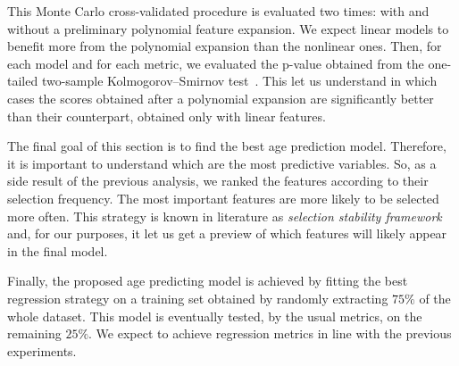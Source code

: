 This Monte Carlo cross-validated procedure is evaluated two times: with and without a preliminary polynomial feature expansion. We expect linear models to benefit more from the polynomial expansion than the nonlinear ones.
Then, for each model and for each metric, we evaluated the p-value obtained from the one-tailed two-sample Kolmogorov–Smirnov test~\cite{everitt2002cambridge}. This let us understand in which cases the scores obtained after a polynomial expansion are significantly better than their counterpart, obtained only with  linear features.

The final goal of this section is to find the best age prediction model. Therefore, it is important to understand which are the most predictive variables.
So, as a side result of the previous analysis, we ranked the features according to their selection frequency. The most important features are more likely to be selected more often. This strategy is known in literature as  \textit{selection stability framework}~\cite{meinshausen2010stability, barbieri16palladio} and, for our purposes, it let us get a preview of which features will likely appear in the final model.

Finally, the proposed age predicting model is achieved by fitting the best regression strategy on a training set obtained by randomly extracting $75\%$ of the whole dataset. This model is eventually tested, by the usual metrics, on the remaining $25\%$. We expect to achieve regression metrics in line with the previous experiments.

